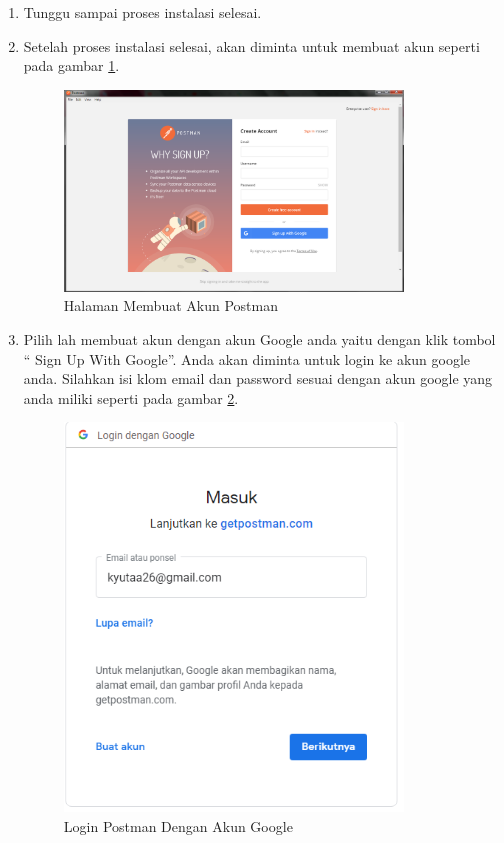\begin{enumerate}
\item Tunggu sampai proses instalasi selesai.
\item Setelah proses instalasi selesai, akan diminta untuk membuat akun seperti pada gambar \ref{fig:hap}.
\begin{figure}[!htbp]
	\centerline{\includegraphics[width=0.85\textwidth]{figures/11/hap.PNG}}
	\caption{Halaman Membuat Akun Postman}
	\label{fig:hap}
\end{figure} 

\item Pilih lah membuat akun dengan akun Google anda yaitu dengan klik tombol “ Sign Up With Google”. Anda akan diminta untuk login ke akun google anda. Silahkan isi klom email dan password sesuai dengan akun google yang anda miliki seperti pada gambar \ref{fig:lpg}.
\begin{figure}[!htbp]
	\centerline{\includegraphics[width=0.85\textwidth]{figures/11/lpg.PNG}}
	\caption{Login Postman Dengan Akun Google}
	\label{fig:lpg}
\end{figure}


\end{enumerate}
